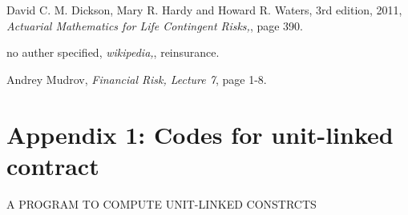 \documentclass{report}
\begin{document}
\begin{thebibliography}{99}
  David C. M. Dickson, Mary R. Hardy and Howard R. Waters,
    3rd edition, 2011, 
    {\em Actuarial Mathematics for Life Contingent Risks,},
    page 390.

  no auther specified,
    {\em wikipedia,},
    reinsurance.

  Andrey Mudrov,
    {\em Financial Risk, Lecture 7},
    page 1-8.











\end{thebibliography}


\chapter*{Appendix 1: Codes for unit-linked contract}

\begin{center}
   {\Large A PROGRAM TO COMPUTE UNIT-LINKED CONSTRCTS}
\end{center}
\end{document}
